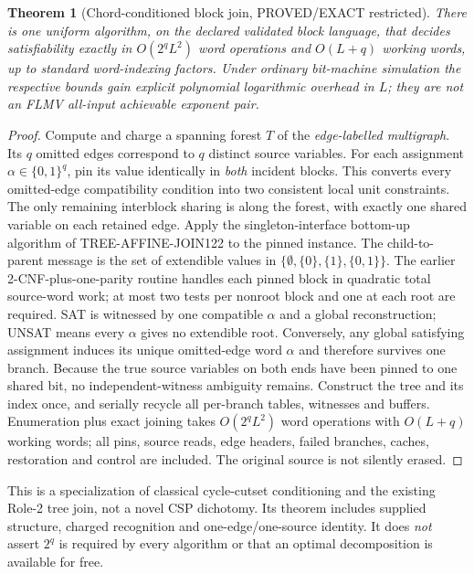 \documentclass[11pt]{article}
\newtheorem{theorem}{Theorem}
\begin{document}
\begin{theorem}[Chord-conditioned block join, PROVED/EXACT restricted]
There is one uniform algorithm, on the declared validated block language, that decides satisfiability exactly in $O(2^qL^2)$ word operations and $O(L+q)$ working words, up to standard word-indexing factors. Under ordinary bit-machine simulation the respective bounds gain explicit polynomial logarithmic overhead in $L$; they are \emph{not} an FLMV all-input achievable exponent pair.
\end{theorem}
\begin{proof}
Compute and charge a spanning forest $T$ of the \emph{edge-labelled multigraph}. Its $q$ omitted edges correspond to $q$ distinct source variables. For each assignment $\alpha\in\{0,1\}^q$, pin its value identically in \emph{both} incident blocks. This converts every omitted-edge compatibility condition into two consistent local unit constraints. The only remaining interblock sharing is along the forest, with exactly one shared variable on each retained edge. Apply the singleton-interface bottom-up algorithm of TREE-AFFINE-JOIN122 to the pinned instance. The child-to-parent message is the set of extendible values in $\{\emptyset,\{0\},\{1\},\{0,1\}\}$. The earlier 2-CNF-plus-one-parity routine handles each pinned block in quadratic total source-word work; at most two tests per nonroot block and one at each root are required. SAT is witnessed by one compatible $\alpha$ and a global reconstruction; UNSAT means every $\alpha$ gives no extendible root. Conversely, any global satisfying assignment induces its unique omitted-edge word $\alpha$ and therefore survives one branch. Because the true source variables on both ends have been pinned to one shared bit, no independent-witness ambiguity remains. Construct the tree and its index once, and serially recycle all per-branch tables, witnesses and buffers. Enumeration plus exact joining takes $O(2^qL^2)$ word operations with $O(L+q)$ working words; all pins, source reads, edge headers, failed branches, caches, restoration and control are included. The original source is not silently erased. \end{proof}
This is a specialization of classical cycle-cutset conditioning and the existing Role-2 tree join, not a novel CSP dichotomy. Its theorem includes supplied structure, charged recognition and one-edge/one-source identity. It does \emph{not} assert $2^q$ is required by every algorithm or that an optimal decomposition is available for free.
\end{document}
